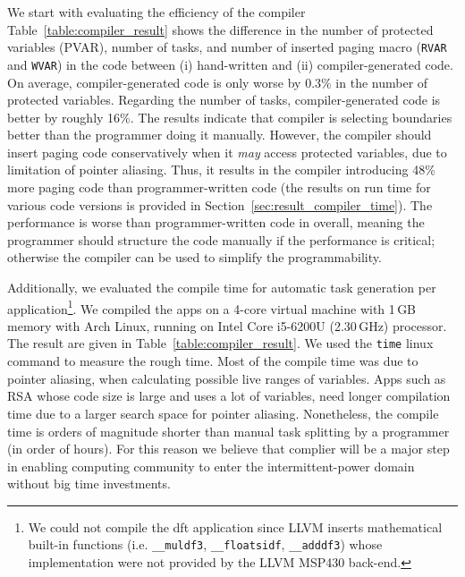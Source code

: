 We start with evaluating the efficiency of the \sys compiler Table~\ref{table:compiler_result} shows the difference in the number of protected variables (PVAR), number of tasks, and number of inserted paging macro ({\tt RVAR} and {\tt WVAR}) in the code between (i) hand-written \sys and (ii) compiler-generated \sys code. On average, compiler-generated code is only worse by 0.3\% in the number of protected variables. Regarding the number of tasks, compiler-generated code is better by roughly 16\%. The results indicate that \sys compiler is selecting boundaries better than the programmer doing it manually. However, the \sys compiler should insert paging code conservatively when it {\em may} access protected variables, due to limitation of pointer aliasing. Thus, it results in the \sys compiler introducing 48\% more paging code than programmer-written code (the results on run time for various \sys code versions is provided in Section~\ref{sec:result_compiler_time}). The performance is worse than programmer-written \sys code in overall, meaning the programmer should structure the code manually if the performance is critical; otherwise the compiler can be used to simplify the programmability. 

Additionally, we evaluated the compile time for automatic task generation per application\footnote{We could not compile the dft application since LLVM inserts mathematical built-in functions (i.e. \texttt{\_\_muldf3}, \texttt{\_\_floatsidf}, \texttt{\_\_adddf3}) whose implementation were not provided by the LLVM MSP430 back-end.}. We compiled the apps on a 4-core virtual machine with 1\,GB memory with Arch Linux, running on Intel Core i5-6200U (2.30\,GHz) processor. The result are given in Table~\ref{table:compiler_result}. We used the {\tt time} linux command to measure the rough time. Most of the compile time was due to pointer aliasing, when calculating possible live ranges of variables. Apps such as RSA whose code size is large and uses a lot of variables, need longer compilation time due to a larger search space for pointer aliasing. Nonetheless, the compile time is orders of magnitude shorter than manual task splitting by a programmer (in  order of hours). For this reason we believe that \sys complier will be a major step in enabling computing community to enter the intermittent-power domain without big time investments.

%

